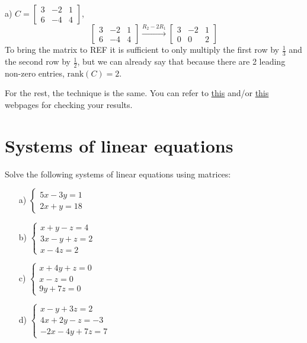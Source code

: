 \begin{solution}
     a) $C=\begin{bmatrix}
3 & -2 & 1 \\
6 & -4 & 4
    \end{bmatrix}$,
    \[
    \begin{bmatrix}
3 & -2 & 1 \\
6 & -4 & 4
    \end{bmatrix}
\xrightarrow{R_2 -2 R_1}
    \begin{bmatrix}
3 & -2 & 1 \\
0 & 0 & 2
    \end{bmatrix}
    \]
To bring the matrix to REF it is sufficient to only multiply the first row by $\frac{1}{3}$ and the second row by $\frac{1}{2}$, but we can already say that because there are 2 leading non-zero entries, $\text{rank}(C)=2$.

For the rest, the technique is the same. You can refer to \href{https://matrixcalc.org/slu.html}{this} and/or \href{https://matrix.reshish.com/rankCalculation.php}{this} webpages for checking your results. 
\end{solution}

\section{Systems of linear equations}
\begin{problem}%
    Solve the following systems of linear equations using matrices:

    \begin{enumerate}
        \item[a) ] $\begin{cases}
            5x-3y=1\\
            2x+y=18
        \end{cases}$
        
        \item[b) ] $\begin{cases}
            x+y-z=4\\
            3x-y+z=2\\
            x-4z=2
        \end{cases}$
        
        \item[c) ] $\begin{cases}
            x+4y+z=0\\
            x-z=0\\
            9y+7z=0
        \end{cases}$
        
        \item[d) ] $\begin{cases}
            x-y+3z=2\\
            4x+2y-z=-3\\
            -2x-4y+7z=7
        \end{cases}$
        
    \end{enumerate}
\end{problem}

